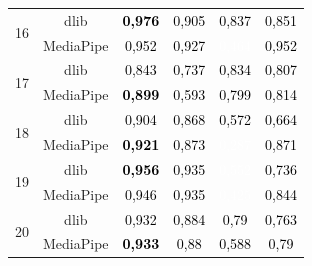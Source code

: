 \begin{table}[]
\begin{tabular}{c | c | c c c c}
\multirow{2}{*}{16} & dlib & \cellcolor[HTML] {06F900}\textcolor{black}{\textbf{0,976}} & \cellcolor[HTML] {18E700}\textcolor{black}{0,905} & \cellcolor[HTML] {28D600}\textcolor{black}{0,837} & \cellcolor[HTML] {26D900}\textcolor{black}{0,851} \\ & MediaPipe & \cellcolor[HTML] {0CF300}\textcolor{black}{0,952} & \cellcolor[HTML] {11ED00}\textcolor{black}{0,927} & \cellcolor[HTML] {897600}\textcolor{white}{0,464} & \cellcolor[HTML] {0CF300}\textcolor{black}{0,952} \\ \hline
\multirow{2}{*}{17} & dlib & \cellcolor[HTML] {28D700}\textcolor{black}{0,843} & \cellcolor[HTML] {42BC00}\textcolor{black}{0,737} & \cellcolor[HTML] {29D500}\textcolor{black}{0,834} & \cellcolor[HTML] {30CE00}\textcolor{black}{0,807} \\ & MediaPipe & \cellcolor[HTML] {18E600}\textcolor{black}{\textbf{0,899}} & \cellcolor[HTML] {689700}\textcolor{black}{0,593} & \cellcolor[HTML] {32CC00}\textcolor{black}{0,799} & \cellcolor[HTML] {2FD000}\textcolor{black}{0,814} \\ \hline
\multirow{2}{*}{18} & dlib & \cellcolor[HTML] {18E700}\textcolor{black}{0,904} & \cellcolor[HTML] {20DE00}\textcolor{black}{0,868} & \cellcolor[HTML] {6D9200}\textcolor{black}{0,572} & \cellcolor[HTML] {56A900}\textcolor{black}{0,664} \\ & MediaPipe & \cellcolor[HTML] {14EB00}\textcolor{black}{\textbf{0,921}} & \cellcolor[HTML] {20DF00}\textcolor{black}{0,873} & \cellcolor[HTML] {B64900}\textcolor{white}{0,287} & \cellcolor[HTML] {20DE00}\textcolor{black}{0,871} \\ \hline
\multirow{2}{*}{19} & dlib & \cellcolor[HTML] {0BF300}\textcolor{black}{\textbf{0,956}} & \cellcolor[HTML] {10EF00}\textcolor{black}{0,935} & \cellcolor[HTML] {718D00}\textcolor{white}{0,552} & \cellcolor[HTML] {42BC00}\textcolor{black}{0,736} \\ & MediaPipe & \cellcolor[HTML] {0DF200}\textcolor{black}{0,946} & \cellcolor[HTML] {10EF00}\textcolor{black}{0,935} & \cellcolor[HTML] {936C00}\textcolor{white}{0,425} & \cellcolor[HTML] {27D800}\textcolor{black}{0,844} \\ \hline
\multirow{2}{*}{20} & dlib & \cellcolor[HTML] {10EE00}\textcolor{black}{0,932} & \cellcolor[HTML] {1DE200}\textcolor{black}{0,884} & \cellcolor[HTML] {35CA00}\textcolor{black}{0,79} & \cellcolor[HTML] {3CC300}\textcolor{black}{0,763} \\ & MediaPipe & \cellcolor[HTML] {10EE00}\textcolor{black}{\textbf{0,933}} & \cellcolor[HTML] {1EE100}\textcolor{black}{0,88} & \cellcolor[HTML] {699600}\textcolor{black}{0,588} & \cellcolor[HTML] {35CA00}\textcolor{black}{0,79} \\ \hline

\end{tabular}
\end{table}
